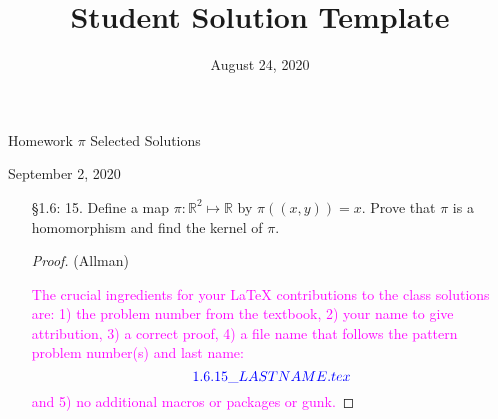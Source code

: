 \documentclass{report}
\title{Student Solution Template}
\date{August 24, 2020}
\newcommand{\assignmentNumber}[1]{Homework #1 Selected Solutions}
\newcommand{\duedate}[1]{#1}
\newcommand\R{{\mathbb R}}
\theoremstyle{plain}
\begin{document}
 

\centerline{\sc \Large \assignmentNumber{$\pi$}}
\smallskip
\centerline{\duedate{September 2, 2020}}

\begin{enumerate}
		
\item[\S 1.6: 15.] Define a map $\pi: \R^2 \mapsto \R$ by $\pi((x,y)) = x$.  Prove that
	$\pi$ is a homomorphism and find the kernel of $\pi$.
		
\begin{proof} (Allman) 
			
\textcolor{magenta}{The crucial ingredients for your \LaTeX\xspace
		contributions to the class solutions are:
		1) the problem number from the textbook, 2) your name to give attribution, 3)
		a correct proof, 4) a file name that follows the pattern problem number(s) and last name:
		$$
				\textcolor{blue}{1.6.15\_LASTNAME.tex}
		$$
and 5) no additional macros or packages or gunk.}
			
\end{proof}
		

\end{enumerate}
\end{document}

